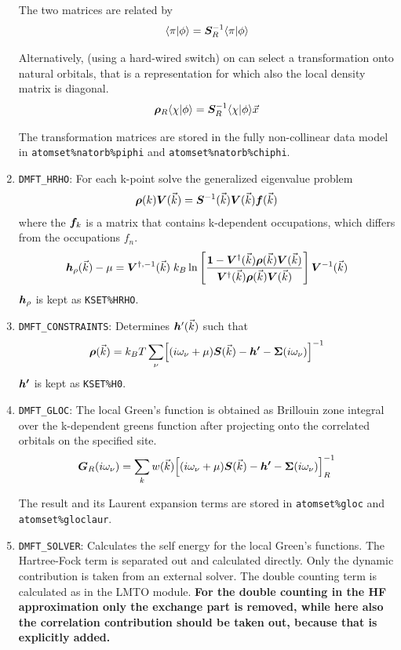 \documentclass[11pt,a4paper]{report}
\begin{document}
\begin{enumerate}
The two matrices are related by
\begin{eqnarray}
\langle\pi|\phi\rangle=\bm{S}^{-1}_R\langle\pi|\phi\rangle
\end{eqnarray}

Alternatively, (using a hard-wired switch) on can select a
transformation onto natural orbitals, that is a representation for
which also the local density matrix is diagonal.
\begin{eqnarray}
\bm{\rho}_R\langle\chi|\phi\rangle=\bm{S}^{-1}_R
\langle\chi|\phi\rangle \vec{x}
\end{eqnarray}

The transformation matrices are stored in the fully non-collinear data
model in \verb|atomset%natorb%piphi| and \verb|atomset%natorb%chiphi|.
%
\item \verb|DMFT_HRHO|: For each k-point solve the generalized
  eigenvalue problem
\begin{eqnarray*}
\bm{\rho}(k)\bm{V}(\vec{k})=
\bm{S}^{-1}(\vec{k})\bm{V}(\vec{k})\bm{f}(\vec{k})
\end{eqnarray*}
where the $\bm{f}_k$ is a matrix that contains k-dependent
occupations, which differs from the occupations $f_n$.
\begin{eqnarray}
\bm{h}_\rho(\vec{k})-\mu=\bm{V}^{\dagger,-1}(\vec{k})\; k_B
\ln\left[
\frac{\bm{1}-\bm{V}^\dagger(\vec{k})\bm{\rho}(\vec{k})\bm{V}(\vec{k})}
{\bm{V}^\dagger(\vec{k})\bm{\rho}(\vec{k})\bm{V}(\vec{k})}
\right]\bm{V}^{-1}(\vec{k})
\end{eqnarray}
$\bm{h}_\rho$ is kept as \verb|KSET%HRHO|.
%
\item \verb|DMFT_CONSTRAINTS|: Determines $\bm{h}'(\vec{k})$ such that
\begin{eqnarray}
\bm{\rho}(\vec{k})=k_BT\sum_\nu \Bigl[(i\omega_\nu+\mu)\bm{S}(\vec{k})-
\bm{h'}-\bm{\Sigma}(i\omega_\nu)\Bigr]^{-1}
\end{eqnarray}
$\bm{h'}$ is kept as \verb|KSET%H0|.
%
\item \verb|DMFT_GLOC|: The local Green's function is obtained as
  Brillouin zone integral over the k-dependent greens function after
  projecting onto the correlated orbitals on the specified site.
\begin{eqnarray}
\bm{G}_R(i\omega_\nu)=\sum_k w(\vec{k})
\Bigl[(i\omega_\nu+\mu)\bm{S}(\vec{k})-
\bm{h'}-\bm{\Sigma}(i\omega_\nu)\Bigr]^{-1}_R
\end{eqnarray}

The result and its Laurent expansion terms are stored in
\verb|atomset%gloc| and \verb|atomset%gloclaur|.
%
\item \verb|DMFT_SOLVER|: Calculates the self energy for the local
  Green's functions. The Hartree-Fock term is separated out and
  calculated directly. Only the dynamic contribution is taken from an
  external solver. The double counting term is calculated as in the
  LMTO module. \textbf{For the double counting in the HF approximation
    only the exchange part is removed, while here also the correlation
    contribution should be taken out, because that is explicitly
    added.}


\end{enumerate}
\end{document}
